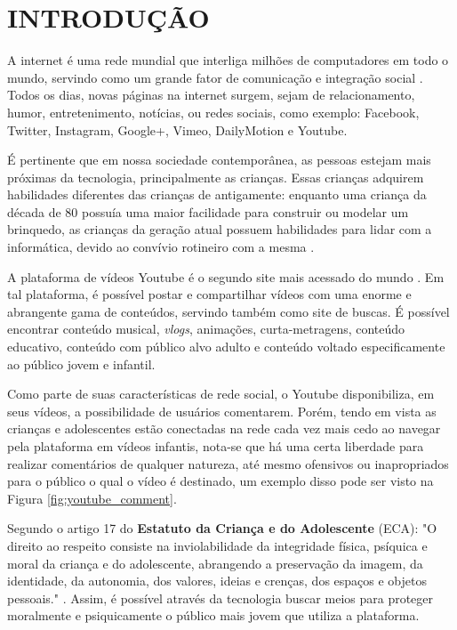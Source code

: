 \newpage
\section{INTRODUÇÃO}


A internet é uma rede mundial que interliga milhões de computadores em todo o mundo, servindo como um grande fator de comunicação e integração social \cite{marioFalcao2015}. Todos os dias, novas páginas na internet surgem, sejam de relacionamento, humor, entretenimento, notícias, ou redes sociais, como exemplo: Facebook, Twitter, Instagram, Google+, Vimeo, DailyMotion e Youtube.

É pertinente que em nossa sociedade contemporânea, as pessoas estejam mais próximas da tecnologia, principalmente as crianças. 
Essas crianças adquirem habilidades diferentes das crianças de antigamente: enquanto uma criança da década de 80 possuía uma maior facilidade para construir ou modelar um brinquedo, as crianças da geração atual possuem habilidades para lidar com a informática, devido ao convívio rotineiro com a mesma \cite{marioFalcao2016}.

A plataforma de vídeos Youtube é o segundo site mais acessado do mundo \cite{alexaYoutube}. Em tal plataforma, é possível postar e compartilhar vídeos com uma enorme e abrangente gama de conteúdos, servindo também como site de buscas. É possível encontrar conteúdo musical, \textit{vlogs}, animações, curta-metragens, conteúdo educativo, conteúdo com público alvo adulto e conteúdo voltado especificamente ao público jovem e infantil. 

Como parte de suas características de rede social, o Youtube disponibiliza, em seus vídeos, a possibilidade de usuários comentarem. Porém, tendo em vista as crianças e adolescentes estão conectadas na rede cada vez mais cedo \cite{EnyoGoncalves2017} ao navegar pela plataforma em vídeos infantis, nota-se que há uma certa liberdade para realizar comentários de qualquer natureza, até mesmo ofensivos ou inapropriados para o público o qual o vídeo é destinado, um exemplo disso pode ser visto na Figura \ref{fig:youtube_comment}.

Segundo o artigo 17 do \textbf{Estatuto da Criança e do Adolescente} (ECA): "O direito ao respeito consiste na inviolabilidade da integridade física, psíquica e moral da criança e do adolescente, abrangendo a preservação da imagem, da identidade, da autonomia, dos valores, ideias e crenças, dos espaços e objetos pessoais." \cite{eca_lei}.  Assim, é possível através da tecnologia buscar meios para proteger moralmente e psiquicamente o público mais jovem que utiliza a plataforma. %

